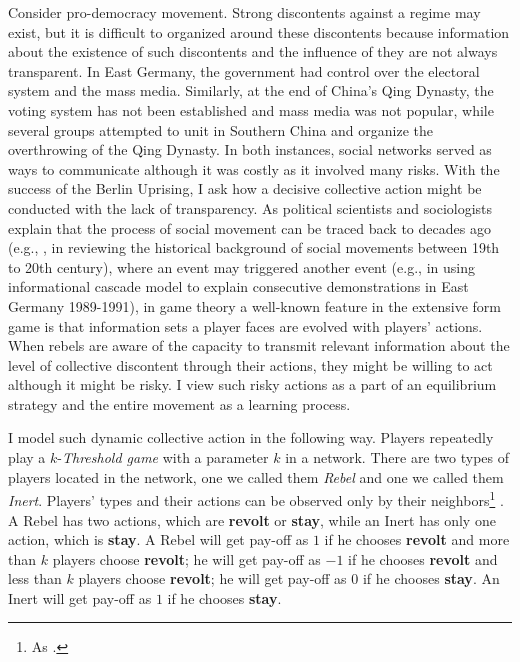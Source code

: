 \documentclass[12pt,letter]{article}
\theoremstyle{definition}
\theoremstyle{remark}
\theoremstyle{claim}
\begin{document}
Consider pro-democracy movement. Strong discontents against a regime may exist, but it is difficult to organized around these discontents because information about the existence of such discontents and the influence of they are not always transparent. In East Germany, the government had control over the electoral system and the mass media. Similarly, at the end of China's Qing Dynasty, the voting system has not been established and mass media was not popular,  while several groups attempted to unit in Southern China and organize the overthrowing of the Qing Dynasty. In both instances, social networks served as ways to communicate although it was costly as it involved many risks. With the success of the Berlin Uprising, I ask how a decisive collective action might be conducted with the lack of transparency. As political scientists and sociologists explain that the process of social movement can be traced back to decades ago (e.g., \citep{McAdamDoung;TarrowSidney;Tilly2001}, \citep{McAdam2003} in reviewing the historical background of social movements between 19th to 20th century), where an event may triggered another event (e.g., \citep{Lohmann2011} in using informational cascade model to explain consecutive demonstrations in East Germany 1989-1991), in game theory a well-known feature in the extensive form game is that information sets a player faces are evolved with players' actions. When rebels are aware of the capacity to transmit relevant information about the level of collective discontent through their actions, they might be willing to act although it might be risky. I view such risky actions as a part of an equilibrium strategy and the entire movement as a learning process. 




I model such dynamic collective action in the following way. Players repeatedly play a $k$-\textit{Threshold game} with a parameter $k$ in a network. There are two types of players located in the network, one we called them \textit{Rebel} and one we called them \textit{Inert}.  Players' types and their actions can be observed only by their neighbors\footnote{As \citep{chwe2000}.} . A Rebel has two actions, which are \textbf{revolt} or \textbf{stay}, while an Inert has only one action, which is \textbf{stay}. A Rebel will get pay-off as $1$ if he chooses \textbf{revolt} and more than $k$ players choose \textbf{revolt}; he will get pay-off as $-1$ if he chooses \textbf{revolt} and less than $k$ players choose \textbf{revolt}; he will get pay-off as $0$ if he chooses \textbf{stay}. An Inert will get pay-off as $1$ if he chooses \textbf{stay}.
\end{document}
